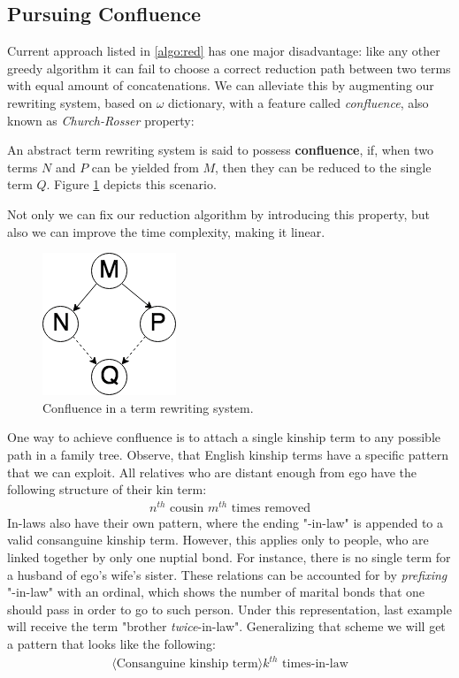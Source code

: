     \subsection{Pursuing Confluence}
    Current approach listed in \ref{algo:red} has one major disadvantage: like any other greedy algorithm it can fail to choose a
    correct reduction path between two terms with equal amount of concatenations.
    We can alleviate this by augmenting our rewriting system, based on $\omega$ dictionary, with a feature called \textit{confluence},
    also known as \textit{Church-Rosser} property:
    \begin{definition}
        An abstract term rewriting system is said to possess \textbf{confluence}, if, when two terms $N$ and $P$ can be yielded from $M$,
        then they can be reduced to the single term $Q$. Figure \ref{fig:conf} depicts this scenario.
    \end{definition}
    Not only we can fix our reduction algorithm by introducing this property, but also we can improve the time complexity, making it
    linear.

    \begin{figure}
        \centering
        \includegraphics[width=0.2\linewidth]{figs/confluence.png}
        \caption{Confluence in a term rewriting system.}
        \label{fig:conf}
    \end{figure}

    One way to achieve confluence is to attach a single kinship term to any possible path in a family tree.
    Observe, that English kinship terms have a specific pattern that we can exploit. All relatives who are distant enough from ego
    have the following structure of their kin term:
    \begin{align*}
        n^{th} \text{ cousin } m^{th} \text{ times removed}
    \end{align*}
    In-laws also have their own pattern, where the ending "-in-law" is appended to a valid consanguine kinship term. However, this
    applies only to people, who are linked together by only one nuptial bond. For instance, there is no single term for a husband of
    ego's wife's sister. These relations can be accounted for by \textit{prefixing} "-in-law" with an ordinal, which shows the number
    of marital bonds that one should pass in order to go to such person. Under this representation, last example will receive the term
    "brother
    \textit{twice}-in-law". Generalizing that scheme we will get a pattern that looks like the following:
    \begin{align*}
        \langle \text{Consanguine kinship term} \rangle k^{th} \text{ times-in-law}
    \end{align*}

